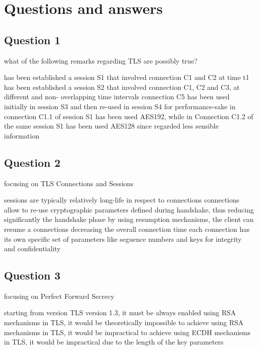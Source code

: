\section{Questions and answers}
\subsection*{Question 1}

what of the following remarks regarding TLS are possibly true?
\begin{itemize}
  \correct has been established a session S1 that involved
    connection C1 and C2 at time t1
  \correct has been established a session S2 that involved
    connection C1, C2 and C3, at different and non- overlapping time
    intervals
  \incorrect connection C5 has been used initially in session S3
    and then re-used in session S4 for performance-sake
  \incorrect in connection C1.1 of session S1 has been used
    AES192, while in Connection C1.2 of the same session S1 has been
    used AES128 since regarded less sensible information
\end{itemize}

\subsection*{Question 2}
focusing on TLS Connections and Sessions
\begin{itemize}
  \correct sessions are typically relatively long-life in respect to
  connections
  \incorrect connections allow to re-use cryptographic parameters
  defined during handshake, thus reducing significantly the handshake
  phase
  \incorrect by using resumption mechanisms, the client can resume a
  connections decreasing the overall connection time
  \correct each connection has its own specific set of parameters like
  seguence numbers and keys for integrity and confidentiality
\end{itemize}
\subsection*{Question 3}
focusing on Perfect Forward Secrecy
\begin{itemize}
  \correct starting from version TLS version 1.3, it must be always
  enabled
  \incorrect using RSA mechanisms in TLS, it would be theoretically
  impossible to achieve
  \correct using RSA mechanisms in TLS, it would be impractical to
  achieve
  \incorrect using ECDH mechanisms in TLS, it would be impractical due
  to the length of the key parameters
\end{itemize}
